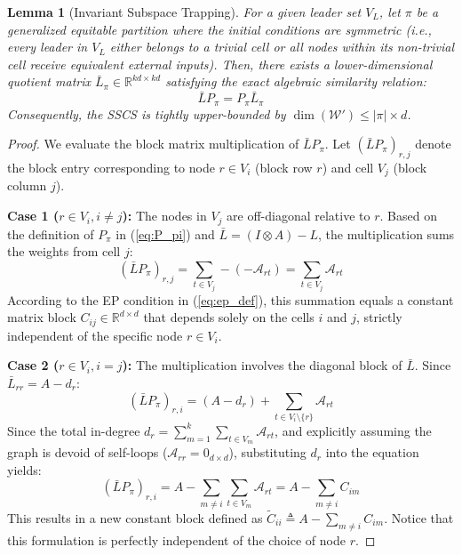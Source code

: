 \documentclass{IEEEtran}
\newtheorem{lemma}{Lemma}
\begin{document}
	\begin{lemma}[Invariant Subspace Trapping]
		For a given leader set $V_L$, let $\pi$ be a generalized equitable partition where the initial conditions are symmetric (i.e., every leader in $V_L$ either belongs to a trivial cell or all nodes within its non-trivial cell receive equivalent external inputs). Then, there exists a lower-dimensional quotient matrix $\bar{L}_\pi \in \mathbb{R}^{kd \times kd}$ satisfying the exact algebraic similarity relation:
		\begin{equation}
			\bar{L} P_\pi = P_\pi \bar{L}_\pi \label{eq:quotient}
		\end{equation}
		Consequently, the SSCS is tightly upper-bounded by $\dim(\mathcal{W}') \le |\pi| \times d$.
	\end{lemma}
	
	\begin{proof}
		We evaluate the block matrix multiplication of $\bar{L} P_\pi$. Let $(\bar{L} P_\pi)_{r, j}$ denote the block entry corresponding to node $r \in V_i$ (block row $r$) and cell $V_j$ (block column $j$). 
		
		\textbf{Case 1 ($r \in V_i, i \neq j$):} The nodes in $V_j$ are off-diagonal relative to $r$. Based on the definition of $P_\pi$ in (\ref{eq:P_pi}) and $\bar{L} = (I \otimes A) - L$, the multiplication sums the weights from cell $j$:
		\begin{equation}
			(\bar{L} P_\pi)_{r, j} = \sum_{t \in V_j} -(-\mathcal{A}_{rt}) = \sum_{t \in V_j} \mathcal{A}_{rt}
		\end{equation}
		According to the EP condition in (\ref{eq:ep_def}), this summation equals a constant matrix block $C_{ij} \in \mathbb{R}^{d \times d}$ that depends solely on the cells $i$ and $j$, strictly independent of the specific node $r \in V_i$.
		
		\textbf{Case 2 ($r \in V_i, i = j$):} The multiplication involves the diagonal block of $\bar{L}$. Since $\bar{L}_{rr} = A - d_r$:
		\begin{equation}
			(\bar{L} P_\pi)_{r, i} = (A - d_r) + \sum_{t \in V_i \setminus \{r\}} \mathcal{A}_{rt}
		\end{equation}
		Since the total in-degree $d_r = \sum_{m=1}^k \sum_{t \in V_m} \mathcal{A}_{rt}$, and explicitly assuming the graph is devoid of self-loops ($\mathcal{A}_{rr} = 0_{d \times d}$), substituting $d_r$ into the equation yields:
		\begin{equation}
			(\bar{L} P_\pi)_{r, i} = A - \sum_{m \neq i} \sum_{t \in V_m} \mathcal{A}_{rt} = A - \sum_{m \neq i} C_{im}
		\end{equation}
		This results in a new constant block defined as $\tilde{C}_{ii} \triangleq A - \sum_{m \neq i} C_{im}$. Notice that this formulation is perfectly independent of the choice of node $r$. 
		

\end{proof}
\end{document}
